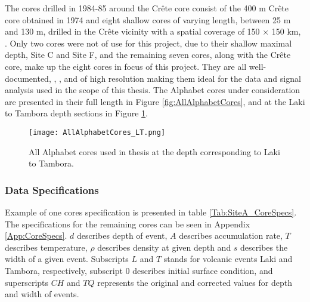 \documentclass[../../CompleteThesis2/Complete_2ndDraft]{subfiles}
\begin{document}
The cores drilled in 1984-85 around the Crête core consist of the 400 m Crête core obtained in 1974 \cite{bibid} and eight shallow cores of varying length, between 25 m and 130 m, drilled in the Crête vicinity with a spatial coverage of 150 $\times$ 150 km, \cite[Clausen, Gundestrup, Johnsen 1988]{Clausen1988}.
Only two cores were not of use for this project, due to their shallow maximal depth, Site C and Site F, and the remaining seven cores, along with the Crête core, make up the eight cores in focus of this project. They are all well-documented, \cite[Clausen \& Hammer, 1988]{ClausenHammer1988}, \cite[Clausen, Gundestrup, Johnsen 1988]{Clausen1988}, and of high resolution making them ideal for the data and signal analysis used in the scope of this thesis. The Alphabet cores under consideration are presented in their full length in Figure \ref{fig:AllAlphabetCores}, and at the Laki to Tambora depth sections in Figure \ref{fig:AllAlphabetCores_LT}.


\begin{figure}[h]
	\centering
	\texttt{[image: AllAlphabetCores\_LT.png]}
	\caption[]{All Alphabet cores used in thesis at the depth corresponding to Laki to Tambora.}
	\label{fig:AllAlphabetCores_LT}
\end{figure}



\subsubsection[Data Specifications][Data Specifications]{Data Specifications}
\label{Subsubsec:Data_Selection_Alhabet_Specifications}



Example of one cores specification is presented in table \ref{Tab:SiteA_CoreSpecs}. The specifications for the remaining cores can be seen in Appendix \ref{App:CoreSpecs}. 
$d$ describes depth of event, $A$ describes accumulation rate, $T$ describes temperature, $\rho$ describes density at given depth and $s$ describes the width of a given event. Subscripts $L$ and $T$ stands for volcanic events Laki and Tambora, respectively, subscript $0$ describes initial surface condition, and superscripts $CH$ and $TQ$ represents the original and corrected values for depth and width of events.
\end{document}
